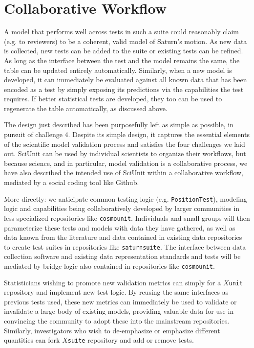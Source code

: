 \documentclass[9pt]{sig-alternate}
\newcommand{\verbx}[1]{\lstinline{#1}}
\begin{document}
\section{Collaborative Workflow}\label{scidash}
A model that performs well across tests in such a suite could reasonably claim (e.g. to reviewers) to be a coherent, valid model of Saturn's motion. As new data is collected, new tests can be added to the suite or existing tests can be refined. As long as the interface between the test and the model remains the same, the table can be updated entirely automatically. Similarly, when a new model is developed, it can immediately be evaluated against all known data that has been encoded as a test by simply exposing its predictions via the capabilities the test requires. If better statistical tests are developed, they too can be used to regenerate the table automatically, as discussed above.

The design just described has been purposefully left as simple as possible, in pursuit of challenge 4. Despite its simple design, it captures the essential elements of the scientific model validation process and satisfies the four challenges we laid out. SciUnit can be used by individual scientists to organize their workflows, but because science, and in particular, model validation is a collaborative process, we have also described the intended use of SciUnit within a collaborative workflow, mediated by a social coding tool like Github. 

More directly: we anticipate common testing logic (e.g. \verbx{PositionTest}), modeling logic and capabilities being collaboratively developed by larger communities in less specialized repositories like \verbx{cosmounit}. Individuals and small groups will then parameterize these tests and models with data they have gathered, as well as data known from the literature and data contained in existing data repositories to create test suites in repositories like \verbx{saturnsuite}. The interface between data collection software and existing data representation standards and tests will be mediated by bridge logic also contained in repositories like \verbx{cosmounit}.  %

Statisticians wishing to promote new validation metrics can simply for a $X$\verbx{unit} repository and implement new test logic. By reusing the same interfaces as previous tests used, these new metrics can immediately be used to validate or invalidate a large body of existing models, providing valuable data for use in convincing the community to adopt these into the mainstream repositories. Similarly, investigators who wish to de-emphasize or emphasize different quantities can fork $X$\verbx{suite} repository and add or remove tests.
\end{document}
